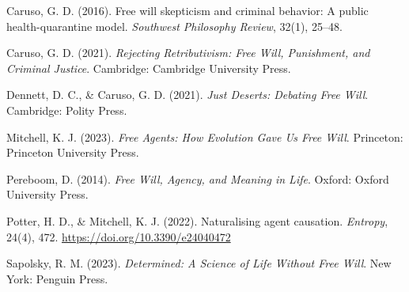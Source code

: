 \documentclass[11pt,oneside]{report}
\theoremstyle{definition}
\theoremstyle{remark}
\newenvironment{reflist}
  {\par\small\setlength{\parindent}{0pt}%
   \setlength{\leftskip}{1.6em}\setlength{\parindent}{-1.6em}%
   \setlength{\parskip}{0.4em}%
   \raggedright\hyphenpenalty=50\exhyphenpenalty=50\relax
   \sloppy}
  {\par}
\begin{document}
\begin{reflist}
Caruso, G. D. (2016). Free will skepticism and criminal behavior: A public health-quarantine model. \emph{Southwest Philosophy Review}, 32(1), 25--48.

Caruso, G. D. (2021). \emph{Rejecting Retributivism: Free Will, Punishment, and Criminal Justice}. Cambridge: Cambridge University Press.

Dennett, D. C., \& Caruso, G. D. (2021). \emph{Just Deserts: Debating Free Will}. Cambridge: Polity Press.

Mitchell, K. J. (2023). \emph{Free Agents: How Evolution Gave Us Free Will}. Princeton: Princeton University Press.

Pereboom, D. (2014). \emph{Free Will, Agency, and Meaning in Life}. Oxford: Oxford University Press.

Potter, H. D., \& Mitchell, K. J. (2022). Naturalising agent causation. \emph{Entropy}, 24(4), 472. \url{https://doi.org/10.3390/e24040472}

Sapolsky, R. M. (2023). \emph{Determined: A Science of Life Without Free Will}. New York: Penguin Press.
\end{reflist}
\end{document}
